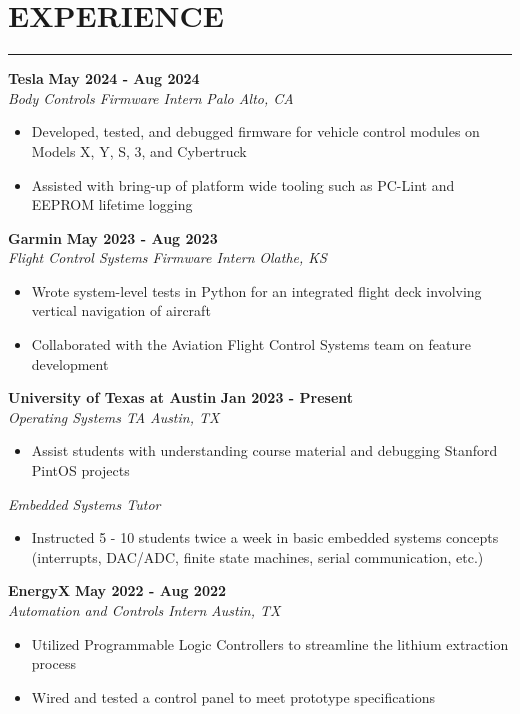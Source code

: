 \documentclass{article}
\newcommand{\sectionHeader}[1]{%
    \vspace{-1.5\baselineskip}
    \section*{\MakeUppercase{\large #1}} %
    \vspace{-1.75\baselineskip} %
    \color{teal}
    \rule{\textwidth}{2pt} %
    \color{black}
    \vspace{-1.5\baselineskip}
    \pdfbookmark[1]{#1}{#1}
}
\newcommand{\role}[3]{
    \textit{#1} \hfill \textit{#2} \\[0pt]
    #3
}
\newcommand{\sectionItem}[5]{ %
    \textbf{#1} \hfill \textbf{#2} \\[0pt]
    \role{#3}{#4}{#5}    %
    \vspace{5pt}
}
\begin{document}
\sectionHeader{experience}
\begin{flushleft}
    \sectionItem{Tesla}{May 2024 - Aug 2024}{Body Controls Firmware Intern}{Palo Alto, CA}{
        \begin{itemize}
            \item[\textbullet] Developed, tested, and debugged firmware for vehicle control modules on Models X, Y, S, 3, and Cybertruck
            \item[\textbullet] Assisted with bring-up of platform wide tooling such as PC-Lint and EEPROM lifetime logging
        \end{itemize}   
    }
    
    \sectionItem{Garmin}{May 2023 - Aug 2023}{Flight Control Systems Firmware Intern}{Olathe, KS}{
        \begin{itemize}
            \item[\textbullet] Wrote system-level tests in Python for an integrated flight deck involving vertical navigation of aircraft
            \item[\textbullet] Collaborated with the Aviation Flight Control Systems team on feature development
        \end{itemize}
    }

    \sectionItem{University of Texas at Austin}{Jan 2023 - Present}{Operating Systems TA}{Austin, TX}{
        \begin{itemize}
            \item[\textbullet] Assist students with understanding course material and debugging Stanford PintOS projects
        \end{itemize}
        \vspace{2.5pt}
        \role{Embedded Systems Tutor}{}{
            \begin{itemize}
                \item[\textbullet] Instructed 5 - 10 students twice a week in basic embedded systems concepts (interrupts, DAC/ADC, finite state machines, serial communication, etc.)
            \end{itemize}
        }
    }

    \sectionItem{EnergyX}{May 2022 - Aug 2022}{Automation and Controls Intern}{Austin, TX}{
        \begin{itemize}
            \item[\textbullet] Utilized Programmable Logic Controllers to streamline the lithium extraction process
            \item[\textbullet] Wired and tested a control panel to meet prototype specifications
        \end{itemize}
    }
\end{flushleft}
\end{document}

